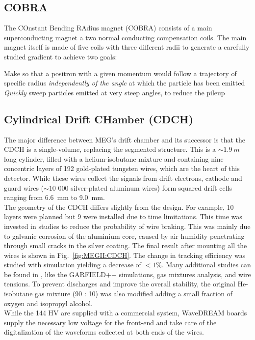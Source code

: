 \begin{refsection}
    \subsection{COBRA}
    \label{MEG:COBRA}
        The COnstant Bending RAdius magnet (COBRA) consists of a main superconducting magnet a two normal conducting compensation coils.
        The main magnet itself is made of five coils with three different radii to generate a carefully studied gradient to achieve two goals:
        \begin{outline}
            \1 Make so that a positron with a given momentum would follow a trajectory of specific radius \textit{independently of the angle} at which the particle has been emitted
            \1 \textit{Quickly} sweep particles emitted at very steep angles, to reduce the pileup
        \end{outline}
        
    \subsection{Cylindrical Drift CHamber (CDCH)}
        The major difference between MEG's drift chamber and its successor is that the CDCH is a single-volume, replacing the segmented structure.
        This is a $\sim\SI{1.9}{m}$ long cylinder, filled with a helium-isobutane mixture and containing nine concentric layers of 192 gold-plated tungsten wires, which are the heart of this detector.
        While these wires collect the signals from drift electrons, cathode and guard wires ($\sim$10 000 silver-plated aluminum wires) form squared drift cells ranging from \SI{6.6}{mm} to \SI{9.0}{mm}.\\
        The geometry of the CDCH differs slightly from the design.
        For example, 10 layers were planned but 9 were installed due to time limitations. This time was invested in studies to reduce the probability of wire braking.
        This was mainly due to galvanic corrosion of the aluminium core, caused by air humidity penetrating through small cracks in the silver coating.
        The final result after mounting all the wires is shown in Fig.~\ref{fig:MEGII:CDCH}.
        The change in tracking efficiency was studied with simulation yielding a decrease of $< 1\%$.
        Many additional studies can be found in \cite{MEG_II:detector}, like the GARFIELD++ simulations, gas mixtures analysis, and wire tensions.
        To prevent discharges and improve the overall stability, the original He-isobutane gas mixture (90 : 10) was also modified adding a small fraction of oxygen and isopropyl alcohol.\\
        While the 144 HV are supplied with a commercial system, WaveDREAM boards supply the necessary low voltage for the front-end and take care of the digitalization of the waveforms collected at both ends of the wires.


\end{refsection}
